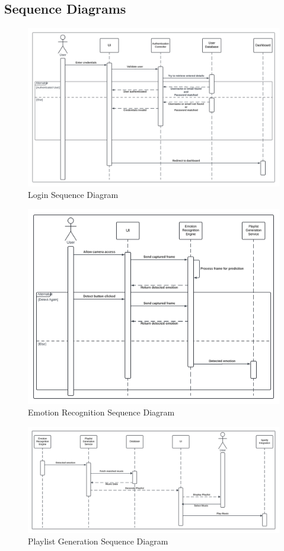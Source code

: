 \subsection{Sequence Diagrams}
\begin{figure}[!ht]
    \centering
    \includegraphics[width=14cm]{Images/login-sequence.png}
    \caption{Login Sequence Diagram}
    \label{fig:login-sequence}
\end{figure}
\begin{figure}[!ht]
    \centering
    \includegraphics[width=14cm]{Images/fer-sequence.png}
    \caption{Emotion Recognition Sequence Diagram}
    \label{fig:fer-sequence}
\end{figure}
\begin{figure}[!ht]
    \centering
    \includegraphics[width=14cm]{Images/playlist-sequence.png}
    \caption{Playlist Generation Sequence Diagram}
    \label{fig:playlist-sequence}
\end{figure}
